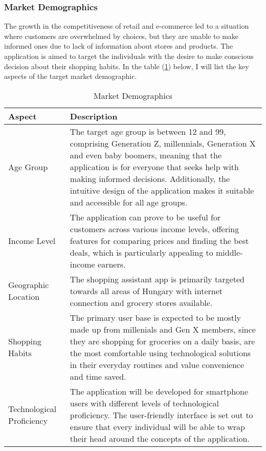 \subsubsection{Market Demographics}

The growth in the competitiveness of retail and e-commerce led to a situation where customers are overwhelmed by choices, but they are unable to make informed ones due to lack of information about stores and products. The application is aimed to target the individuals with the desire to make conscious decision about their shopping habits. In the table (\ref{tab:md}) below, I will list the key aspects of the target market demographic.

\begin{table}[h]
	\centering
	\begin{tabularx}{\textwidth}{|p{3cm}|X|}
		\hline
		\textbf{Aspect} & \textbf{Description} \\
		\hline
		Age Group & The target age group is between 12 and 99, comprising Generation Z, millennials, Generation X and even baby boomers, meaning that the application is for everyone that seeks help with making informed decisions. Additionally, the intuitive design of the application makes it suitable and accessible for all age groups. \\
		\hline
		Income Level & The application can prove to be useful for customers across various income levels, offering features for comparing prices and finding the best deals, which is particularly appealing to middle-income earners. \\
		\hline
		Geographic Location & The shopping assistant app is primarily targeted towards all areas of Hungary with internet connection and grocery stores available. \\
		\hline
		Shopping Habits & The primary user base is expected to be mostly made up from millenials and Gen X members, since they are shopping for groceries on a daily basis, are the most comfortable using technological solutions in their everyday routines and value convenience and time saved. \\
		\hline
		Technological Proficiency & The application will be developed for smartphone users with different levels of technological proficiency. The user-friendly interface is set out to ensure that every individual will be able to wrap their head around the concepts of the application.\\
		\hline
	\end{tabularx}
	\caption{Market Demographics}
	\label{tab:md}
\end{table}

